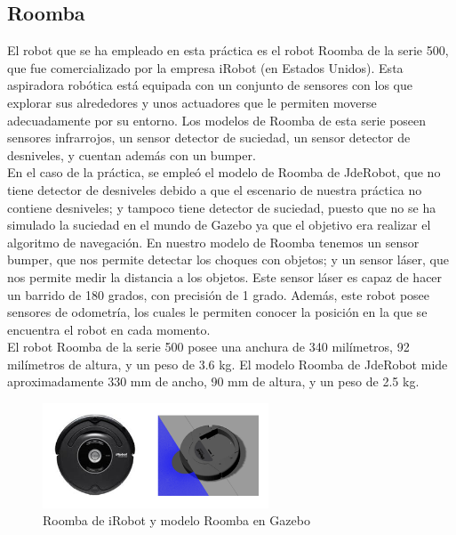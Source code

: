 \subsection{Roomba}
El robot que se ha empleado en esta práctica es el robot Roomba de la serie 500, que fue comercializado por la empresa iRobot (en Estados Unidos). Esta aspiradora robótica está equipada con un conjunto de sensores con los que explorar sus alrededores y unos actuadores que le permiten moverse adecuadamente por su entorno. Los modelos de Roomba de esta serie poseen sensores infrarrojos, un sensor detector de suciedad, un sensor detector de desniveles, y cuentan además con un bumper. \\

En el caso de la práctica, se empleó el modelo de Roomba de JdeRobot, que no tiene detector de desniveles debido a que el escenario de nuestra práctica no contiene desniveles; y tampoco tiene detector de suciedad, puesto que no se ha simulado la suciedad en el mundo de Gazebo ya que el objetivo era realizar el algoritmo de navegación. En nuestro modelo de Roomba tenemos un sensor bumper, que nos permite detectar los choques con objetos; y un sensor láser, que nos permite medir la distancia a los objetos. Este sensor láser es capaz de hacer un barrido de 180 grados, con precisión de 1 grado. Además, este robot posee sensores de odometría, los cuales le permiten conocer la posición en la que se encuentra el robot en cada momento.\\

El robot Roomba de la serie 500 posee una anchura de 340 milímetros, 92 milímetros de altura, y un peso de 3.6 kg. El modelo Roomba de JdeRobot mide aproximadamente 330 mm de ancho, 90 mm de altura, y un peso de 2.5 kg.\\

\begin{figure}[H]
  \begin{center}
    \includegraphics[width=0.6\textwidth]{figures/Vacuum/Roombas.png}
		\caption{Roomba de iRobot y modelo Roomba en Gazebo}
		\label{fig.roombas}
		\end{center}
\end{figure}

